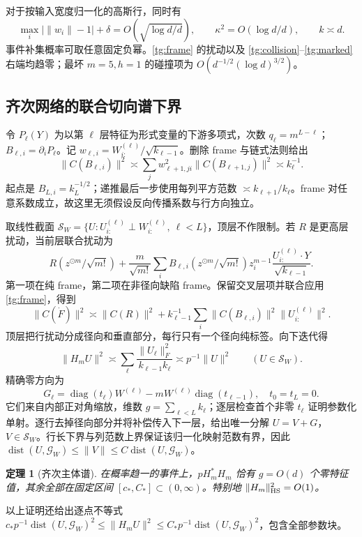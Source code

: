 \documentclass[a4paper]{tufte-handout}
\newtheorem{theorem}{定理}
\begin{document}
\begin{fullwidth}
对于按输入宽度归一化的高斯行，同时有
\[
 \max_i|\|w_i\|-1|+\delta=O(\sqrt{\log d/d}),\qquad
 \kappa^2=O(\log d/d),\qquad k\asymp d.
\]
事件补集概率可取任意固定负幂。\eqref{tg:frame} 的扰动以及 \eqref{tg:collision}--\eqref{tg:marked} 右端均趋零；最坏 $m=5,h=1$ 的碰撞项为 $O(d^{-1/2}(\log d)^{3/2})$。

\subsection{齐次网络的联合切向谱下界}
令 $P_\ell(Y)$ 为以第 $\ell$ 层特征为形式变量的下游多项式，次数 $q_\ell=m^{L-\ell}$；$B_{\ell,i}=\partial_iP_\ell$。记 $w_{\ell,i}=W^{(\ell)}_{i:}/\sqrt{k_{\ell-1}}$。删除 frame 与链式法则给出
\[
 \|C(B_{\ell,i})\|^2\asymp
 \sum_jw_{\ell+1,ji}^2\|C(B_{\ell+1,j})\|^2\asymp k_\ell^{-1}.\tag{TG.3}
\]
起点是 $B_{L,i}=k_L^{-1/2}$；递推最后一步使用每列平方范数 $\asymp k_{\ell+1}/k_\ell$。frame 对任意系数成立，故这里无须假设反向传播系数与行方向独立。

取线性截面 $\mathcal S_W=\{U:U^{(\ell)}_{i:}\perp W^{(\ell)}_{i:},\ \ell<L\}$，顶层不作限制。若 $R$ 是更高层扰动，当前层联合扰动为
\[
 R(z^{\odot m}/\sqrt{m!})+
 \frac{m}{\sqrt{m!}}\sum_i B_{\ell,i}(z^{\odot m}/\sqrt{m!})z_i^{m-1}
       \frac{U^{(\ell)}_{i:}\cdot Y}{\sqrt{k_{\ell-1}}}.
\]
第一项在纯 frame，第二项在非径向缺陷 frame。保留交叉层项并联合应用 \eqref{tg:frame}，得到
\[
 \|C(\dot F)\|^2\asymp\|C(R)\|^2+
 k_{\ell-1}^{-1}\sum_i\|C(B_{\ell,i})\|^2\|U^{(\ell)}_{i:}\|^2.
\]
顶层把行扰动分成径向和垂直部分，每行只有一个径向纯标签。向下迭代得
\[
 \|H_mU\|^2\asymp\sum_\ell\frac{\|U_\ell\|_F^2}{k_{\ell-1}k_\ell}
 \asymp p^{-1}\|U\|^2\qquad(U\in\mathcal S_W).\tag{TG.4}
\]
精确零方向为
\[
 G_\ell=\operatorname{diag}(t_\ell)W^{(\ell)}-mW^{(\ell)}\operatorname{diag}(t_{\ell-1}),
 \quad t_0=t_L=0.
\]
它们来自内部正对角缩放，维数 $g=\sum_{\ell<L}k_\ell$；逐层检查首个非零 $t_\ell$ 证明参数化单射。逐行去掉径向部分并将补偿传入下一层，给出唯一分解 $U=V+G$，$V\in\mathcal S_W$。行长下界与列范数上界保证该归一化映射范数有界，因此
$\operatorname{dist}(U,\mathcal G_W)\le\|V\|\le C\operatorname{dist}(U,\mathcal G_W)$。
\begin{theorem}[齐次主体谱]\label{tg:homogeneous-bulk}
在概率趋一的事件上，$pH_m^*H_m$ 恰有 $g=O(d)$ 个零特征值，其余全部在固定区间 $[c_*,C_*]\subset(0,\infty)$。特别地 $\|H_m\|_{\rm HS}^2=O(1)$。
\end{theorem}
以上证明还给出逐点不等式
$c_*p^{-1}\operatorname{dist}(U,\mathcal G_W)^2\le\|H_mU\|^2\le C_*p^{-1}\operatorname{dist}(U,\mathcal G_W)^2$，包含全部参数块。


\end{fullwidth}
\end{document}
